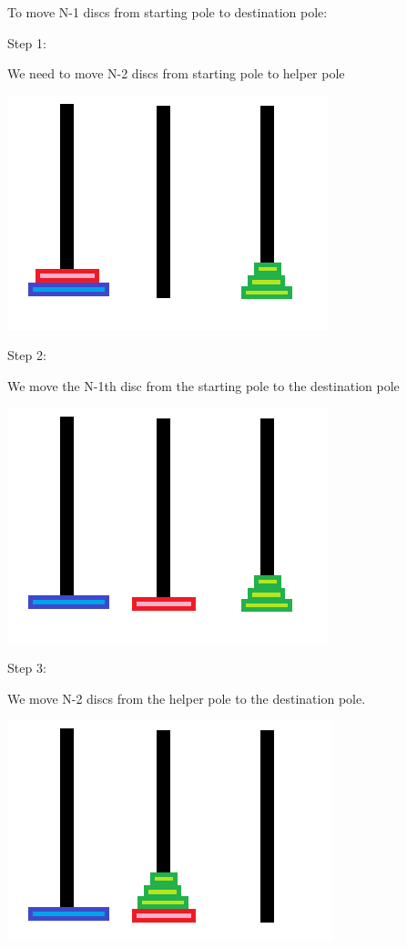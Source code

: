 \documentclass[11pt,oneside]{book}
\makeatletter
\def\maxwidth#1{\ifdim\Gin@nat@width>#1 #1\else\Gin@nat@width\fi}
\makeatother
\begin{document}
To move N-1 discs from starting pole to destination pole:

Step 1:

We need to move N-2 discs from starting pole to helper pole

\includegraphics[width=\maxwidth{\textwidth}]{hanoi5.png}

Step 2:

We move the N-1th disc from the starting pole to the destination pole

\includegraphics[width=\maxwidth{\textwidth}]{hanoi6.png}

Step 3:

We move N-2 discs from the helper pole to the destination pole.

\includegraphics[width=\maxwidth{\textwidth}]{hanoi2.png}
\end{document}
